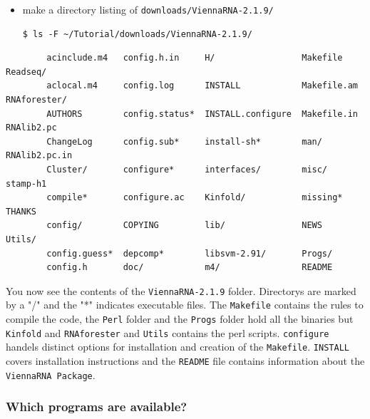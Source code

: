 \documentclass[a4paper]{article}
\newcommand{\frametitle}[1]{\subsubsection{#1}}
\begin{document}
  \begin{itemize}
  \item make a directory listing of \texttt{downloads/ViennaRNA-2.1.9/}
\begin{verbatim}
$ ls -F ~/Tutorial/downloads/ViennaRNA-2.1.9/
\end{verbatim}
  \end{itemize}
  \footnotesize
  \begin{center}
\begin{verbatim}
        acinclude.m4   config.h.in     H/                 Makefile     Readseq/
        aclocal.m4     config.log      INSTALL            Makefile.am  RNAforester/
        AUTHORS        config.status*  INSTALL.configure  Makefile.in  RNAlib2.pc
        ChangeLog      config.sub*     install-sh*        man/         RNAlib2.pc.in
        Cluster/       configure*      interfaces/        misc/        stamp-h1
        compile*       configure.ac    Kinfold/           missing*     THANKS
        config/        COPYING         lib/               NEWS         Utils/
        config.guess*  depcomp*        libsvm-2.91/       Progs/       
        config.h       doc/            m4/                README
\end{verbatim}%
  \end{center}
You now see the contents of the \texttt{ViennaRNA-2.1.9} folder. Directorys are marked 
by a "/" and the "*" indicates executable files. The \texttt{Makefile} contains the rules to
compile the code, the \texttt{Perl} folder and the \texttt{Progs} folder hold all the 
binaries but \texttt{Kinfold} and \texttt{RNAforester} and \texttt{Utils} contains the perl
scripts. \texttt{configure} handels distinct options for installation and creation of the \texttt{Makefile}. \texttt{INSTALL} covers installation instructions 
and the \texttt{README} file contains information about the \texttt{ViennaRNA Package}.


  \frametitle{Which programs are available?}
\end{document}
